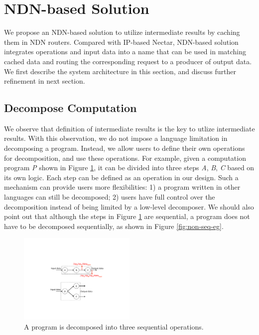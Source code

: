 \section{NDN-based Solution}
We propose an NDN-based solution to utilize intermediate results by caching them in NDN routers.  
Compared with IP-based Nectar, NDN-based solution integrates operations and input data into a name that can be used in matching cached data and routing the corresponding request to a producer of output data.
We first describe the system architecture in this section, and discuss further refinement in next section.

\subsection{Decompose Computation}
We observe that definition of intermediate results is the key to utlize intermediate results.
With this observation, we do not impose a language limitation in decomposing a program.
Instead, we allow users to define their own operations for decomposition, and use these operations.  
For example, given a computation program {\it P} shown in Figure \ref{fig:seq-eg}, it can be divided into three steps {\it A}, {\it B}, {\it C} based on its own logic.  
Each step can be defined as an operation in our design.  
Such a mechanism can provide users more flexibilities: 
1) a program written in other languages can still be decomposed;
2) users have full control over the decomposition instead of being limited by a low-level decomposer.  
We should also point out that although the steps in Figure \ref{fig:seq-eg} are sequential, a program does not have to be decomposed sequentially, as shown in Figure \ref{fig:non-seq-eg}.

\begin{figure}
\begin{center}
\includegraphics[width=0.5\textwidth]{fig-p-r/seq-eg.pdf}
\end{center}
\caption{A program is decomposed into three sequential operations.}
\label{fig:seq-eg}
\end{figure}

